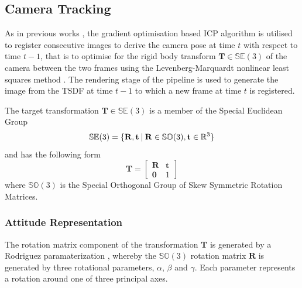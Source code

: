 \subsection{Camera Tracking}
\label{subsec:moseg_static_camera_tracking}
As in previous works \cite{Newcombe2011, Prisacariu2014}, the gradient
optimisation based ICP algorithm is utilised to register consecutive images
to derive the camera pose at time $t$ with respect to time $t-1$, that is to
optimise for the rigid body transform $\mathbf{T} \in \mathbb{SE}(3)$ of the
camera between the two frames using the Levenberg-Marquardt nonlinear least
squares method \cite{NumericalRecipes}. The rendering stage of the pipeline
is used to generate the image from the TSDF at time $t-1$ to which a new frame
at time $t$ is registered.

The target transformation $\mathbf{T} \in \mathbb{SE}(3)$ is a member of the
Special Euclidean Group
\begin{equation}
  \label{eqn:se3_definition}
  \mathbb{SE}(3) = \{\mathbf{R}, \mathbf{t} \:\vert\: \mathbf{R} \in
  \mathbb{SO}(3), \mathbf{t} \in \mathbb{R}^{3}\}
\end{equation}
and has the following form
\begin{equation}
  \label{eqn:trans_mat_definition}
  \mathbf{T} =
  \begin{bmatrix}
    \mathbf{R} & \mathbf{t} \\
    \mathbf{0} & 1
  \end{bmatrix}
\end{equation}
where $\mathbb{SO}(3)$ is the Special Orthogonal Group of Skew Symmetric
Rotation Matrices.

\subsubsection{Attitude Representation}
\label{subsub:moseg_static_camera_attitude}
The rotation matrix component of the transformation $\mathbf{T}$ is
generated by a Rodriguez paramaterization \cite{Shuster1993}, whereby the
$\mathbb{SO}(3)$ rotation matrix $\mathbf{R}$ is generated by three rotational
parameters, $\alpha$, $\beta$ and $\gamma$. Each parameter represents a rotation
around one of three principal axes.

